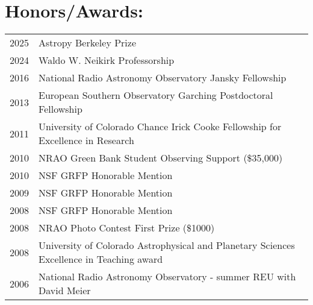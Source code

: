 \clearpage
\setlength{\extrarowheight}{0pt}
\section*{Honors/Awards: }
\begin{tabular}{ll}
     2025 & Astropy Berkeley Prize \\
     2024 & Waldo W. Neikirk Professorship \\
     2016 & National Radio Astronomy Observatory Jansky Fellowship \\
     2013 & European Southern Observatory Garching Postdoctoral Fellowship \\
     2011 & University of Colorado Chance Irick Cooke Fellowship for Excellence in Research \\
     2010 & NRAO Green Bank Student Observing Support (\$35,000) \\
     2010 & NSF GRFP Honorable Mention \\
     2009 & NSF GRFP Honorable Mention \\
     2008 & NSF GRFP Honorable Mention \\
     2008 & NRAO Photo Contest First Prize (\$1000)\\
     2008 & University of Colorado Astrophysical and Planetary Sciences Excellence in Teaching award  \\
     2006 & National Radio Astronomy Observatory - summer REU with David Meier  \\
\end{tabular}

